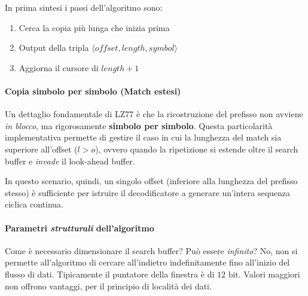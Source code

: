 

In prima sintesi i passi dell'algoritmo sono:
\begin{enumerate}
    \item Cerca la copia più lunga che inizia prima
    \item Output della tripla $\langle \mathit{offset}, \mathit{length}, \mathit{symbol} \rangle$
    \item Aggiorna il cursore di $\mathit{length} + 1$
\end{enumerate}


\paragraph{Copia simbolo per simbolo (Match estesi)}
Un dettaglio fondamentale di LZ77 è che la ricostruzione del prefisso non avviene \textit{in blocco}, ma rigorosamente \textbf{simbolo per simbolo}. 
Questa particolarità implementativa permette di gestire il caso in cui la lunghezza del match sia superiore all'offset ($l > o$), ovvero quando la ripetizione si estende oltre il search buffer e \textit{invade} il look-ahead buffer. 

\begin{center}
\end{center}

In questo scenario, quindi, un singolo offset (inferiore alla lunghezza del prefisso stesso) è sufficiente per istruire il decodificatore a generare un'intera sequenza ciclica continua.



\paragraph{Parametri \textit{strutturali} dell'algoritmo}
Come è necessario dimensionare il search buffer? Può essere \textit{infinito}?
No, non si permette all'algoritmo di cercare all'indietro indefinitamente fino all'inizio del flusso di dati.
Tipicamente il puntatore della finestra è di $12\text{ bit}$. Valori maggiori non offrono vantaggi, per il principio di località dei dati.

